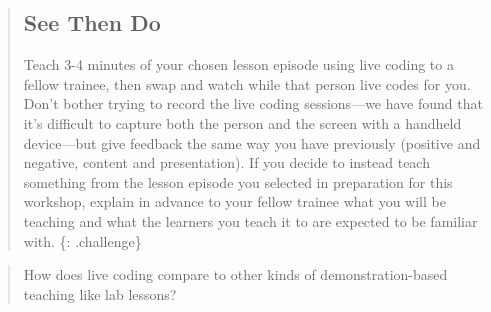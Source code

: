 \begin{quote}
\subsection{See Then Do}\label{see-then-do}

Teach 3-4 minutes of your chosen lesson episode using live coding to a
fellow trainee, then swap and watch while that person live codes for
you. Don't bother trying to record the live coding sessions---we have
found that it's difficult to capture both the person and the screen with
a handheld device---but give feedback the same way you have previously
(positive and negative, content and presentation). If you decide to
instead teach something from the lesson episode you selected in
preparation for this workshop, explain in advance to your fellow trainee
what you will be teaching and what the learners you teach it to are
expected to be familiar with. \{: .challenge\}
\end{quote}

\begin{quote}
How does live coding compare to other kinds of demonstration-based
teaching like lab lessons?
\end{quote}
